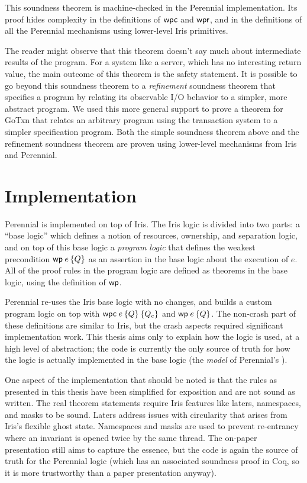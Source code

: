 This soundness theorem is machine-checked in the Perennial implementation. Its
proof hides complexity in the definitions of $\textsf{\upshape wpc}$ and $\textsf{\upshape wpr}$, and in the
definitions of all the Perennial mechanisms using lower-level Iris primitives.

The reader might observe that this theorem doesn't say much about intermediate
results of the program. For a system like a server, which has no interesting
return value, the main outcome of this theorem is the safety statement.
It is possible to go beyond this soundness theorem to a \emph{refinement}
soundness theorem that specifies a program by relating its observable I/O
behavior to a simpler, more abstract program. We used this more general support
to prove a theorem for GoTxn that relates an arbitrary program using the
transaction system to a simpler specification program. Both the simple soundness
theorem above and the refinement soundness theorem are proven using lower-level
mechanisms from Iris and Perennial.

\section{Implementation}
\label{sec:perennial:impl}

Perennial is implemented on top of Iris. The Iris logic is divided into two
parts: a ``base logic'' which defines a notion of resources, ownership, and
separation logic, and on top of this base logic a \emph{program logic} that
defines the weakest precondition $\wpre{e}{Q}$ as an assertion in the base logic
about the execution of $e$. All of the proof rules in the program logic are
defined as theorems in the base logic, using the definition of $\textsf{\upshape wp}$.

Perennial re-uses the Iris base logic with no changes, and builds a custom
program logic on top with $\wpc{e}{Q}{Q_{c}}$ and $\wpre{e}{Q}$. The non-crash
part of these definitions are similar to Iris, but the crash aspects required
significant implementation work. This thesis aims only to explain how the logic
is used, at a high level of abstraction; the code is currently the only
source of truth for how the logic is actually implemented in the base logic (the
\emph{model} of Perennial's \wpcw).

One aspect of the implementation that should be noted is that the rules as
presented in this thesis have been simplified for exposition and are not sound
as written. The real theorem statements require Iris features like laters,
namespaces, and masks to be sound. Laters address issues with circularity that
arises from Iris's flexible ghost state. Namespaces and masks are used to
prevent re-entrancy where an invariant is opened twice by the same thread. The
on-paper presentation still aims to capture the essence, but the code is again
the source of truth for the Perennial logic (which has an associated soundness
proof in Coq, so it is more trustworthy than a paper presentation anyway).

